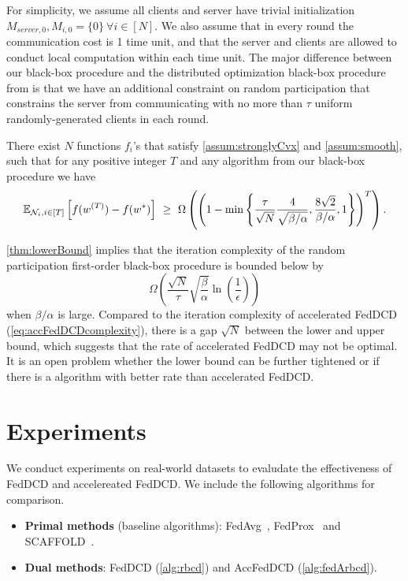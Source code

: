 For simplicity, we assume all clients and server have trivial initialization $M_{server, 0}, M_{i,0} = \{0\}~\forall i \in [N]$. We also assume that in every round the communication cost is 1 time unit, and that the server and clients are allowed to conduct local computation within each time unit. The major difference between our black-box procedure and the distributed optimization black-box procedure from \citet{Scaman2017OptimalAF} is that we have an additional constraint on random participation that constrains the server from communicating with no more than $\tau$ uniform randomly-generated clients in each round.

\begin{theorem} \label{thm:lowerBound}
    There exist $N$ functions $f_i$'s that satisfy \autoref{assum:stronglyCvx} and \autoref{assum:smooth}, such that for any positive integer $T$ and any algorithm from our black-box procedure we have
    \begin{align}
       \mathbb{E}_{ \mathcal{N}_i, i \in [T] } \left[ f( w^{(T)} ) - f(w^*) \right]  ~\geq~ \Omega \left( \left( 1 - \min\left\{ \frac{\tau}{\sqrt{N}} \frac{4}{ \sqrt{ \beta/\alpha }}, \frac{8 \sqrt{2} }{\beta/\alpha} , 1\right\} \right)^T \right)  \label{eq:lowerBound}.
    \end{align}
\end{theorem}

\autoref{thm:lowerBound} implies that the iteration complexity of the random participation first-order black-box procedure is bounded below by
\[
    \Omega \left( \frac{\sqrt{N}}{\tau} \sqrt{ \frac{\beta}{\alpha} } \ln\left( \frac{1}{\epsilon} \right) \right)
\]
when $\beta/\alpha$ is large. Compared to the iteration complexity of accelerated FedDCD (\autoref{eq:accFedDCDcomplexity}), there is a gap $\sqrt{N}$ between the lower and upper bound, which suggests that the rate of accelerated FedDCD may not be optimal. It is an open problem whether the lower bound can be further tightened or if there is a algorithm with better rate than accelerated FedDCD.


\section{Experiments}
\label{sec:experiments}

We conduct experiments on real-world datasets to evaludate the effectiveness of FedDCD and accelereated FedDCD. We include the following algorithms for comparison. 
\begin{itemize}
    \item \textbf{Primal methods} (baseline algorithms): FedAvg~\citep{mcmahan2017communication}, FedProx~\citep{li2018federated} and SCAFFOLD~\citep{pmlr-v119-karimireddy20a}. 
    \item \textbf{Dual methods}: FedDCD (\autoref{alg:rbcd}) and AccFedDCD (\autoref{alg:fedArbcd}).
\end{itemize}


